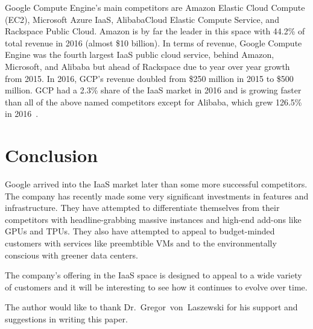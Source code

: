Google Compute Engine's main competitors are Amazon Elastic Cloud
Compute (EC2), Microsoft Azure IaaS, AlibabaCloud Elastic Compute
Service, and Rackspace Public Cloud. Amazon is by far the leader in
this space with 44.2\% of total revenue in 2016 (almost \$10
billion). In terms of revenue, Google Compute Engine was the fourth
largest IaaS public cloud service, behind Amazon, Microsoft, and
Alibaba but ahead of Rackspace due to year over year growth from
2015. In 2016, GCP's revenue doubled from \$250 million in 2015
to \$500 million. GCP had a 2.3\% share of the IaaS market in 2016 and
is growing faster than all of the above named competitors except for
Alibaba, which grew 126.5\% in 2016~\cite{hid-sp18-419-gartnerpr2017}.


\section{Conclusion}

Google arrived into the IaaS market later than some more successful
competitors. The company has recently made some very significant
investments in features and infrastructure. They have attempted to
differentiate themselves from their competitors with headline-grabbing
massive instances and high-end add-ons like GPUs and TPUs. They also
have attempted to appeal to budget-minded customers with services like
preembtible VMs and to the environmentally conscious with greener data
centers.

The company's offering in the IaaS space is designed to appeal to a
wide variety of customers and it will be interesting to see how it
continues to evolve over time.


\begin{acks}

  The author would like to thank Dr.~Gregor~von~Laszewski for his
  support and suggestions in writing this paper.

\end{acks}


 

